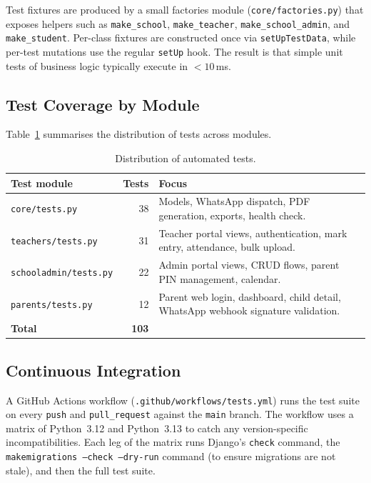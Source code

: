 \documentclass[11pt,a4paper]{article}
\begin{document}
Test fixtures are produced by a small factories module
(\texttt{core/factories.py}) that exposes helpers such as
\texttt{make\_school}, \texttt{make\_teacher}, \texttt{make\_school\_admin},
and \texttt{make\_student}. Per-class fixtures are constructed once via
\texttt{setUpTestData}, while per-test mutations use the regular
\texttt{setUp} hook. The result is that simple unit tests of business logic
typically execute in $<10$\,ms.

\subsection{Test Coverage by Module}

Table~\ref{tab:tests} summarises the distribution of tests across modules.

\begin{table}[h]
\centering
\caption{Distribution of automated tests.}
\label{tab:tests}
\renewcommand{\arraystretch}{1.25}
\begin{tabular}{p{4cm} r p{8cm}}
\toprule
\textbf{Test module} & \textbf{Tests} & \textbf{Focus} \\
\midrule
\texttt{core/tests.py}        & 38 & Models, WhatsApp dispatch, PDF generation, exports, health check. \\
\texttt{teachers/tests.py}    & 31 & Teacher portal views, authentication, mark entry, attendance, bulk upload. \\
\texttt{schooladmin/tests.py} & 22 & Admin portal views, CRUD flows, parent PIN management, calendar. \\
\texttt{parents/tests.py}     & 12 & Parent web login, dashboard, child detail, WhatsApp webhook signature validation. \\
\midrule
\textbf{Total}                & \textbf{103} & \\
\bottomrule
\end{tabular}
\end{table}

\subsection{Continuous Integration}

A GitHub Actions workflow (\texttt{.github/workflows/tests.yml}) runs the
test suite on every \texttt{push} and \texttt{pull\_request} against the
\texttt{main} branch. The workflow uses a matrix of Python~3.12 and
Python~3.13 to catch any version-specific incompatibilities. Each leg of
the matrix runs Django's \texttt{check} command, the
\texttt{makemigrations --check --dry-run} command (to ensure migrations
are not stale), and then the full test suite.
\end{document}
